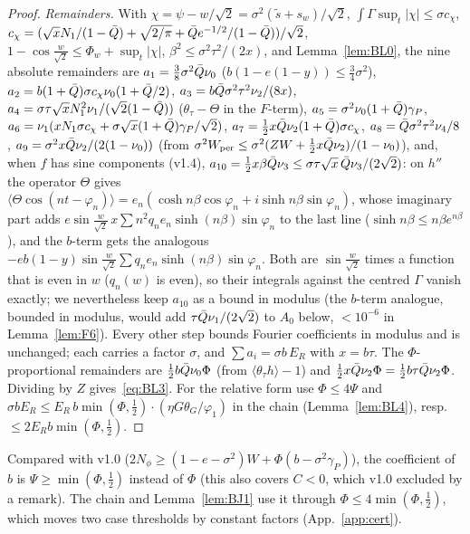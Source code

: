 \begin{proof}
\emph{Remainders.} With $\chi=\psi-w/\sqrt2=\sigma^2(\tilde s+s_w)/\sqrt2$, $\int\Gamma\sup_t|\chi|\le\sigma c_\chi$,
$c_\chi=(\sqrt xN_1/(1-\bar Q)+\sqrt{2/\pi}+\bar Q e^{-1/2}/(1-\bar Q))/\sqrt2$, $1-\cos\frac w{\sqrt2}\le\Phi_w+\sup_t|\chi|$, $\beta^2\le\sigma^2\tau^2/(2x)$, and
Lemma~\ref{lem:BL0}, the nine absolute remainders are
$a_1=\tfrac38\sigma^2\bar Q\nu_0$ ($b(1-e(1-y))\le\frac34\sigma^2$),
$a_2=b(1+\bar Q)\sigma c_\chi\nu_0(1+\bar Q/2)$,
$a_3=b\bar Q\sigma^2\tau^2\nu_2/(8x)$,
$a_4=\sigma\tau\sqrt xN_1^2\nu_1/(\sqrt2(1-\bar Q))$ ($\theta_\tau-\Theta$ in the $F$-term),
$a_5=\sigma^2\nu_0(1+\bar Q)\gamma_P$,
$a_6=\nu_1(xN_1\sigma c_\chi+\sigma\sqrt x(1+\bar Q)\gamma_P/\sqrt2)$,
$a_7=\tfrac12x\bar Q\nu_2(1+\bar Q)\sigma c_\chi$,
$a_8=\bar Q\sigma^2\tau^2\nu_4/8$,
$a_9=\sigma^2x\bar Q\nu_2/(2(1-\nu_0))$ (from $\sigma^2W_{\mathrm{per}}\le\sigma^2(ZW+\tfrac12x\bar Q\nu_2)/(1-\nu_0)$), and, when $f$ has sine components (v1.4),
$a_{10}=\frac12x\beta\bar Q\nu_3\le\sigma\tau\sqrt x\,\bar Q\nu_3/(2\sqrt2)$: on $h''$ the operator $\Theta$ gives $\langle\Theta\cos(nt-\varphi_n)\rangle=e_n(\cosh n\beta\cos\varphi_n+i\sinh n\beta\sin\varphi_n)$,
whose imaginary part adds $e\sin\frac w{\sqrt2}\,x\sum n^2q_ne_n\sinh(n\beta)\sin\varphi_n$ to the last line ($\sinh n\beta\le n\beta e^{n\beta}$), and the $b$-term gets
the analogous $-eb(1-y)\sin\frac w{\sqrt2}\sum q_ne_n\sinh(n\beta)\sin\varphi_n$. Both are $\sin\frac w{\sqrt2}$ times a function that is even in $w$ ($q_n(w)$ is even), so
their integrals against the centred $\Gamma$ vanish exactly; we nevertheless keep $a_{10}$ as a bound in modulus (the $b$-term analogue, bounded in modulus, would add
$\tau\bar Q\nu_1/(2\sqrt2)$ to $A_0$ below, $<10^{-6}$ in Lemma~\ref{lem:F6}). Every other step bounds Fourier coefficients in modulus and is unchanged;
each carries a factor $\sigma$, and $\sum a_i=\sigma b\,E_R$ with $x=b\tau$. The $\Phi$-proportional remainders are
$\frac12b\bar Q\nu_0\Phi$ (from $\langle\theta_\tau h\rangle-1$) and $\frac12x\bar Q\nu_2\Phi=\frac12b\tau\bar Q\nu_2\Phi$. Dividing by $Z$ gives~\eqref{eq:BL3}.
For the relative form use $\Phi\le4\Psi$ and $\sigma bE_R\le E_R\,b\min(\Phi,\frac12)\cdot(\eta G\theta_G/\varphi_1)$ in the chain (Lemma~\ref{lem:BL4}),
resp.\ $\le2E_Rb\min(\Phi,\frac12)$.
\end{proof}

Compared with v1.0 ($2N_\phi\ge(1-e-\sigma^2)W+\Phi(b-\sigma^2\gamma_P)$), the coefficient of $b$ is $\Psi\ge\min(\Phi,\frac12)$ instead of $\Phi$
(this also covers $C<0$, which v1.0 excluded by a remark). The chain and Lemma~\ref{lem:BJ1} use it through $\Phi\le4\min(\Phi,\frac12)$,
which moves two case thresholds by constant factors (App.~\ref{app:cert}).

